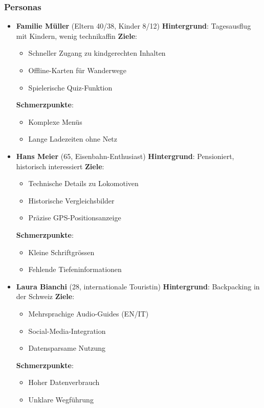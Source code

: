 \documentclass[10pt]{article}
\begin{document}
	\subsubsection{Personas}
	\begin{itemize}
		\item \textbf{Familie Müller} (Eltern 40/38, Kinder 8/12)
		\subitem \textbf{Hintergrund}: Tagesausflug mit Kindern, wenig technikaffin
		\subitem \textbf{Ziele}: 
		\begin{itemize}
			\item Schneller Zugang zu kindgerechten Inhalten
			\item Offline-Karten für Wanderwege
			\item Spielerische Quiz-Funktion
		\end{itemize}
		\subitem \textbf{Schmerzpunkte}: 
		\begin{itemize}
			\item Komplexe Menüs
			\item Lange Ladezeiten ohne Netz
		\end{itemize}
		
		\item \textbf{Hans Meier} (65, Eisenbahn-Enthusiast)
		\subitem \textbf{Hintergrund}: Pensioniert, historisch interessiert
		\subitem \textbf{Ziele}: 
		\begin{itemize}
			\item Technische Details zu Lokomotiven
			\item Historische Vergleichsbilder
			\item Präzise GPS-Positionsanzeige
		\end{itemize}
		\subitem \textbf{Schmerzpunkte}: 
		\begin{itemize}
			\item Kleine Schriftgrössen
			\item Fehlende Tiefeninformationen
		\end{itemize}
		
		\item \textbf{Laura Bianchi} (28, internationale Touristin)
		\subitem \textbf{Hintergrund}: Backpacking in der Schweiz
		\subitem \textbf{Ziele}: 
		\begin{itemize}
			\item Mehrsprachige Audio-Guides (EN/IT)
			\item Social-Media-Integration
			\item Datensparsame Nutzung
		\end{itemize}
		\subitem \textbf{Schmerzpunkte}: 
		\begin{itemize}
			\item Hoher Datenverbrauch
			\item Unklare Wegführung
		\end{itemize}
		

\end{itemize}
\end{document}
